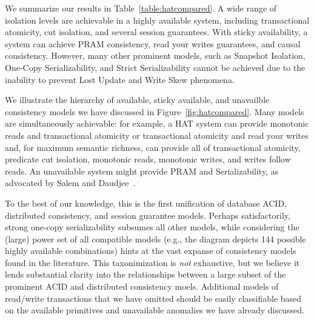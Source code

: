 We summarize our results in Table~\ref{table:hatcompared}. A wide
range of isolation levels are achievable in a highly available system,
including transactional atomicity, cut isolation, and several session
guarantees. With sticky availability, a system can achieve PRAM
consistency, read your writes guarantees, and causal
consistency. However, many other prominent models, such as Snapshot
Isolation, One-Copy Serializability, and Strict Serializability cannot
be achieved due to the inability to prevent Lost Update and Write Skew phenomena.

We illustrate the hierarchy of available, sticky available, and
unavailble consistency models we have discussed in
Figure~\ref{fig:hatcompared}. Many models are simultaneously
achievable: for example, a HAT system can provide monotonic reads and
transactional atomicity or transactional atomicity and read your
writes and, for maximum semantic richness, can provide all of
transactional atomicity, predicate cut isolation, monotonic reads,
monotonic writes, and writes follow reads. An unavailable system might
provide PRAM and Serializability, as advocated by Salem and
Daudjee~\cite{daudjee-session}.

To the best of our knowledge, this is the first unification of
database ACID, distributed consistency, and session guarantee
models. Perhaps satisfactorily, strong one-copy serializability
subsumes all other models, while considering the (large) power set of
all compatible models (e.g., the diagram depicts 144 possible highly available
combinations) hints at the vast expanse of consistency models found in
the literature. This taxonimization is \textit{not} exhaustive, but we
believe it lends substantial clarity into the relationships between a
large subset of the prominent ACID and distributed consistency
moels. Additional models of read/write transactions that we have
omitted should be easily classifiable based on the available
primitives and unavailable anomalies we have already discussed.

 \newcommand{\lostupdate}{$^\dagger$}
 \newcommand{\rwskew}{$^\ddagger$}
 \newcommand{\linearizable}{$^\oplus$}

